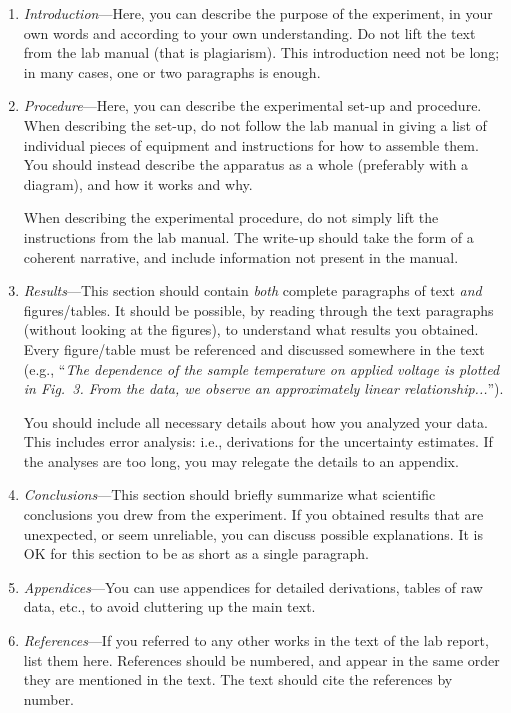 \documentclass[11pt,a4paper]{article}
\begin{document}
\begin{enumerate}
\item \textit{Introduction}---Here, you can describe the purpose of
  the experiment, in your own words and according to your own
  understanding.  Do not lift the text from the lab manual (that is
  plagiarism).  This introduction need not be long; in many cases, one
  or two paragraphs is enough.

\item \textit{Procedure}---Here, you can describe the experimental
  set-up and procedure.  When describing the set-up, do not follow the
  lab manual in giving a list of individual pieces of equipment and
  instructions for how to assemble them.  You should instead describe
  the apparatus as a whole (preferably with a diagram), and how it
  works and why.

  When describing the experimental procedure, do not simply lift the
  instructions from the lab manual.  The write-up should take the form
  of a coherent narrative, and include information not present in the
  manual.

\item \textit{Results}---This section should contain \textit{both}
  complete paragraphs of text \textit{and} figures/tables.  It should
  be possible, by reading through the text paragraphs (without looking
  at the figures), to understand what results you obtained.  Every
  figure/table must be referenced and discussed somewhere in the text
  (e.g., ``\textit{The dependence of the sample temperature on applied
    voltage is plotted in Fig.~3.  From the data, we observe an
    approximately linear relationship...}'').

  You should include all necessary details about how you analyzed your
  data.  This includes error analysis: i.e., derivations for the
  uncertainty estimates.  If the analyses are too long, you may
  relegate the details to an appendix.

\item \textit{Conclusions}---This section should briefly summarize
  what scientific conclusions you drew from the experiment.  If you
  obtained results that are unexpected, or seem unreliable, you can
  discuss possible explanations.  It is OK for this section to be as
  short as a single paragraph.

\item \textit{Appendices}---You can use appendices for detailed
  derivations, tables of raw data, etc., to avoid cluttering up the
  main text.

\item \textit{References}---If you referred to any other works in the
  text of the lab report, list them here.  References should be
  numbered, and appear in the same order they are mentioned in the
  text.  The text should cite the references by number.
\end{enumerate}
\end{document}
